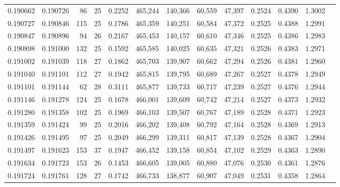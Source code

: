 \begin{tabular}{rrrrrrrrrrrrr}
0.190662 & 0.190726 &  86 &  25 &                                     0.2252 & 465,244 & 140,366 &  60,559 &  47,397 & 0.2524 & 0.4390 & 1.3002 \\
0.190727 & 0.190846 & 115 &  25 &                                     0.1786 & 465,359 & 140,251 &  60,584 &  47,372 & 0.2525 & 0.4388 & 1.2991 \\
0.190847 & 0.190896 &  94 &  26 &                                     0.2167 & 465,453 & 140,157 &  60,610 &  47,346 & 0.2525 & 0.4386 & 1.2983 \\
0.190898 & 0.191000 & 132 &  25 &                                     0.1592 & 465,585 & 140,025 &  60,635 &  47,321 & 0.2526 & 0.4383 & 1.2971 \\
0.191002 & 0.191039 & 118 &  27 &                                     0.1862 & 465,703 & 139,907 &  60,662 &  47,294 & 0.2526 & 0.4381 & 1.2960 \\
0.191040 & 0.191101 & 112 &  27 &                                     0.1942 & 465,815 & 139,795 &  60,689 &  47,267 & 0.2527 & 0.4378 & 1.2949 \\
0.191101 & 0.191144 &  62 &  28 &                                     0.3111 & 465,877 & 139,733 &  60,717 &  47,239 & 0.2527 & 0.4376 & 1.2944 \\
0.191146 & 0.191278 & 124 &  25 &                                     0.1678 & 466,001 & 139,609 &  60,742 &  47,214 & 0.2527 & 0.4373 & 1.2932 \\
0.191280 & 0.191358 & 102 &  25 &                                     0.1969 & 466,103 & 139,507 &  60,767 &  47,189 & 0.2528 & 0.4371 & 1.2923 \\
0.191359 & 0.191424 &  99 &  25 &                                     0.2016 & 466,202 & 139,408 &  60,792 &  47,164 & 0.2528 & 0.4369 & 1.2913 \\
0.191426 & 0.191495 &  97 &  25 &                                     0.2049 & 466,299 & 139,311 &  60,817 &  47,139 & 0.2528 & 0.4367 & 1.2904 \\
0.191497 & 0.191623 & 153 &  37 &                                     0.1947 & 466,452 & 139,158 &  60,854 &  47,102 & 0.2529 & 0.4363 & 1.2890 \\
0.191634 & 0.191723 & 153 &  26 &                                     0.1453 & 466,605 & 139,005 &  60,880 &  47,076 & 0.2530 & 0.4361 & 1.2876 \\
0.191724 & 0.191761 & 128 &  27 &                                     0.1742 & 466,733 & 138,877 &  60,907 &  47,049 & 0.2531 & 0.4358 & 1.2864 \\

\end{tabular}
